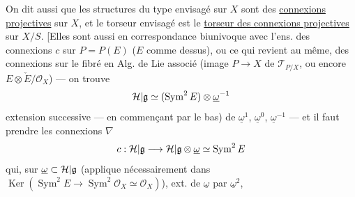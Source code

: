On dit aussi que les structures du type envisagé sur $X$ sont des \uline{connexions projectives} sur $X$, et le torseur envisagé est le \uline{torseur des connexions projectives} sur $X/S$. [Elles sont aussi en correspondance biunivoque avec l'ens. des connexions  $c$ sur $P=P(E)$ ($E$ comme dessus), ou ce qui revient au même, des connexions  sur le fibré en Alg. de Lie associé (image  $P\longrightarrow X$ de $\mathcal T_{P/X}$, ou encore $E\otimes\check E/\mathcal O_X$) --- on trouve
\[{\mathcal H|\mathfrak g}\simeq(\operatorname{Sym}^2E)\otimes\underline\omega^{-1}\]
extension successive --- en commençant par le bas) de $\underline\omega^1$, $\underline\omega^0$, $\underline\omega^{-1}$ --- et il faut prendre les connexions $\nabla$
\[
c:{\mathcal H|\mathfrak g}\longrightarrow{\mathcal H|\mathfrak g}\otimes\underline\omega\simeq\operatorname{Sym}^2E
\]
qui, sur $\underline\omega\subset{\mathcal H|\mathfrak g}$ (applique nécessairement dans $\operatorname{Ker}(\operatorname{Sym}^2E\longrightarrow\operatorname{Sym}^2\mathcal O_X\simeq\mathcal O_X)$), ext. de $\underline\omega$ par $\underline\omega^2$,

